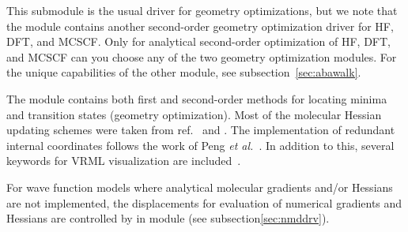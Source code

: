 This submodule is the usual driver for geometry optimizations,
but we note that the  module contains another second-order
geometry optimization driver for HF, DFT, and MCSCF.
Only for analytical second-order optimization of HF, DFT, and MCSCF can you choose
any of the two geometry optimization modules.
For the unique capabilities of the other module, see subsection~\ref{sec:abawalk}.

The  module contains both first and second-order methods
for locating minima and transition states (geometry optimization).
Most of the molecular Hessian updating schemes were taken from
ref.~\cite{thkrprt95} and \cite{Fletcher}.
The implementation of redundant internal coordinates
follows the work of Peng {\it et al.\/}~\cite{cppyahbsmjfjcc17}.
In addition to this, several keywords for VRML visualization are included~\cite{VRML}.

For wave function models where analytical molecular gradients and/or Hessians are not implemented,
the displacements for evaluation of numerical gradients and Hessians
are controlled by  in module  (see subsection\ref{sec:nmddrv}).

